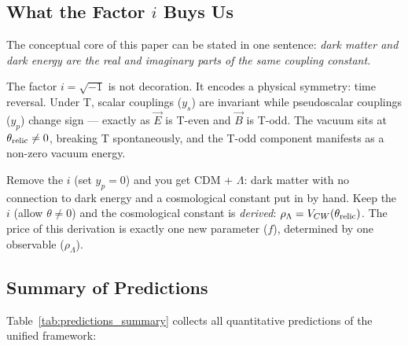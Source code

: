 \subsection{What the Factor \texorpdfstring{$i$}{i} Buys Us}

The conceptual core of this paper can be stated in one sentence:
\emph{dark matter and dark energy are the real and imaginary parts of
the same coupling constant.}

The factor $i = \sqrt{-1}$ is not decoration. It encodes a physical
symmetry: time reversal. Under T, scalar couplings ($y_s$) are invariant
while pseudoscalar couplings ($y_p$) change sign --- exactly as
$\vec{E}$ is T-even and $\vec{B}$ is T-odd. The vacuum sits at
$\theta_{\rm relic} \neq 0$, breaking T spontaneously, and the
T-odd component manifests as a non-zero vacuum energy.

Remove the $i$ (set $y_p = 0$) and you get CDM + $\Lambda$: dark matter
with no connection to dark energy and a cosmological constant put in by hand.
Keep the $i$ (allow $\theta \neq 0$) and the cosmological constant is
\emph{derived}: $\rho_\Lambda = V_{CW}(\theta_{\rm relic})$. The price of
this derivation is exactly one new parameter ($f$), determined by one
observable ($\rho_\Lambda$).

\subsection{Summary of Predictions}

Table~\ref{tab:predictions_summary} collects all quantitative predictions
of the unified framework:

